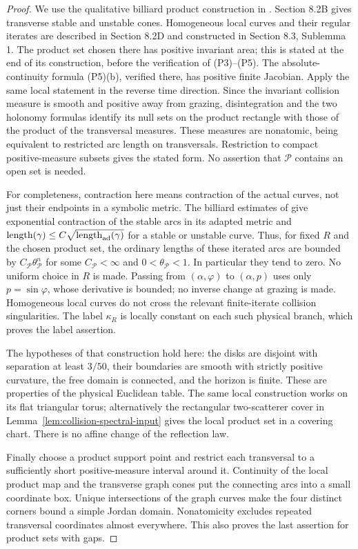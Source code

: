 \begin{proof}
We use the qualitative billiard product construction in
\cite[Sections 8.2--8.3]{Young}. Section 8.2B gives transverse stable
and unstable cones. Homogeneous local curves and their regular iterates
are described in Section 8.2D and constructed in Section 8.3,
Sublemma 1. The product set chosen there has positive invariant area;
this is stated at the end of its construction, before the verification
of (P3)--(P5). The absolute-continuity formula (P5)(b), verified there,
has positive finite Jacobian. Apply the same local statement in the
reverse time direction. Since the invariant collision measure is
smooth and positive away from grazing, disintegration and the two
holonomy formulas identify its null sets on the product rectangle with
those of the product of the transversal measures. These measures are
nonatomic, being equivalent to restricted arc length on transversals.
Restriction to compact positive-measure subsets gives the stated form.
No assertion that $\mathcal P$ contains an open set is needed.

For completeness, contraction here means contraction of the actual
curves, not just their endpoints in a symbolic metric. The billiard
estimates of \cite[Section 8.2C]{Young} give exponential contraction of
the stable arcs in its adapted metric and
$\operatorname{length}(\gamma)\le C\sqrt{\operatorname{length}_{\rm ad}(\gamma)}$
for a stable or unstable curve. Thus, for fixed $R$ and the chosen product set, the ordinary lengths
of these iterated arcs are bounded by $C_{\mathcal P}\theta_{\mathcal P}^n$
for some $C_{\mathcal P}<\infty$ and $0<\theta_{\mathcal P}<1$.
In particular they tend to zero. No uniform choice in $R$ is made. Passing from $(\alpha,\varphi)$ to $(\alpha,p)$ uses only
$p=\sin\varphi$, whose derivative is bounded; no inverse change at
grazing is made. Homogeneous local curves do not cross the relevant
finite-iterate collision singularities. The label $\kappa_R$ is
locally constant on each such physical branch, which proves the label
assertion.

The hypotheses of that construction hold here: the disks are disjoint
with separation at least $3/50$, their boundaries are smooth with
strictly positive curvature, the free domain is connected, and the
horizon is finite. These are properties of the physical Euclidean
table. The same local construction works on its flat triangular torus;
alternatively the rectangular two-scatterer cover in
Lemma~\ref{lem:collision-spectral-input} gives the local product set in
a covering chart. There is no affine change of the reflection law.

Finally choose a product support point and restrict each transversal
to a sufficiently short positive-measure interval around it. Continuity
of the local product map and the transverse graph cones put the
connecting arcs into a small coordinate box. Unique intersections of
the graph curves make the four distinct corners bound a simple Jordan
domain. Nonatomicity excludes repeated transversal coordinates almost
everywhere. This also proves the last assertion for product sets with
gaps.
\end{proof}


